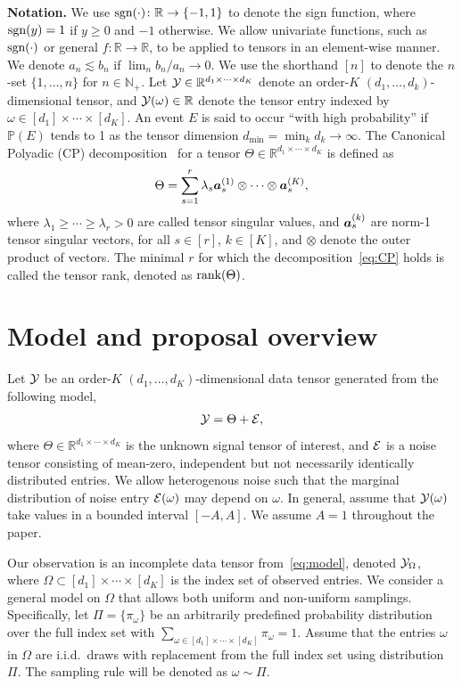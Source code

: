 \documentclass{article}
\theoremstyle{plain}
\theoremstyle{definition}
\def\sign{\textup{sgn}}
\def\rank{\textup{rank}}
\begin{document}
{\bf Notation.}
We use $\sign(\cdot)\colon \mathbb{R}\to\{-1,1\}$ to denote the sign function, where $\sign(y)=1$ if $y\geq 0$ and $-1$ otherwise. We allow univariate functions, such as $\sign(\cdot)$ or general $f\colon \mathbb{R}\to\mathbb{R}$, to be applied to tensors in an element-wise manner. 
We denote $a_n\lesssim b_n$ if $\lim_n b_n/a_n\rightarrow 0.$ We use the shorthand $[n]$ to denote the $n$-set $\{1,\ldots,n\}$ for $n\in\mathbb{N}_{+}$. Let $\mathcal{Y}\in\mathbb{R}^{d_1\times \cdots \times d_K}$ denote an order-$K$ $(d_1,\ldots,d_k)$-dimensional tensor, and $\mathcal{Y}(\omega)\in\mathbb{R}$ denote the tensor entry indexed by $\omega \in[d_1]\times \cdots \times [d_K]$. An event $E$ is said to occur ``with high probability'' if $\mathbb{P}(E)$ tends to 1 as the tensor dimension $d_{\min}=\min_k d_k \to\infty$. The Canonical Polyadic (CP) decomposition~\cite{hitchcock1927expression} for a tensor $\Theta\in\mathbb{R}^{d_1\times \cdots \times d_K}$ is defined as
\begin{equation}\label{eq:CP}
\Theta=\sum_{s=1}^r\lambda_s \bm{a}^{(1)}_s\otimes\cdots\otimes \bm{a}^{(K)}_s,
\end{equation}
where $\lambda_1\geq \cdots \geq \lambda_r>0$ are called tensor singular values, and $\bm{a}^{(k)}_s$ are norm-1 tensor singular vectors, for all $s\in[r]$, $k\in[K]$, and $\otimes$ denote the outer product of vectors.
The minimal $r$ for which the decomposition~\eqref{eq:CP} holds is called the tensor rank, denoted as $\rank(\Theta)$. 


\section{Model and proposal overview}\label{sec:overview}

Let $\mathcal{Y}$ be an order-$K$ $(d_1,\ldots,d_K)$-dimensional data tensor generated from the following model,
\begin{equation}\label{eq:model}
\mathcal{Y}=\Theta+\mathcal{E},
\end{equation}
where $\Theta\in\mathbb{R}^{d_1\times \cdots \times d_K}$ is the unknown signal tensor of interest, and $\mathcal{E}$ is a noise tensor consisting of mean-zero, independent but not necessarily identically distributed entries. We allow heterogenous noise such that the marginal distribution of noise entry $\mathcal{E}(\omega)$ may depend on $\omega$. In general, assume that $\mathcal{Y}(\omega)$ take values in a bounded interval $[-A, A]$. We assume $A=1$ throughout the paper. 

Our observation is an incomplete data tensor from~\eqref{eq:model}, denoted $\mathcal{Y}_\Omega$, where $\Omega\subset[d_1]\times\cdots\times[d_K]$ is the index set of observed entries. We consider a general model on $\Omega$ that allows both uniform and non-uniform samplings. Specifically, let $\Pi=\{\pi_\omega\}$ be an arbitrarily predefined probability distribution over the full index set with $\sum_{\omega\in[d_1]\times \cdots \times [d_K]}\pi_\omega=1$. Assume that the entries $\omega$ in $\Omega$ are i.i.d.\ draws with replacement from the full index set using distribution $\Pi$. The sampling rule will be denoted as $\omega\sim \Pi$.
\end{document}
